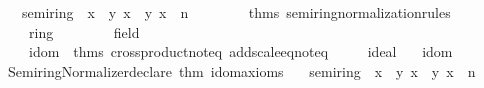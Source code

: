 \begin{isabellebody}
\ \ \ \ {\isacharbraceleft}{\kern0pt}semiring\ {\isacharequal}{\kern0pt}\ {\isacharparenleft}{\kern0pt}{\isacharbrackleft}{\kern0pt}\isactrlterm {\isasymopen}x\ {\isacharplus}{\kern0pt}\ y{\isasymclose}{\isacharcomma}{\kern0pt}\ \isactrlterm {\isasymopen}x\ {\isacharasterisk}{\kern0pt}\ y{\isasymclose}{\isacharcomma}{\kern0pt}\ \isactrlterm {\isasymopen}x\ {\isacharcircum}{\kern0pt}\ n{\isasymclose}{\isacharcomma}{\kern0pt}\ \ \isanewline
\ \ \ \ \ \ {\isacharat}{\kern0pt}{\isacharbraceleft}{\kern0pt}thms\ semiring{\isacharunderscore}{\kern0pt}normalization{\isacharunderscore}{\kern0pt}rules{\isacharbraceright}{\kern0pt}{\isacharparenright}{\kern0pt}{\isacharcomma}{\kern0pt}\isanewline
\ \ \ \ \ ring\ {\isacharequal}{\kern0pt}\ {\isacharparenleft}{\kern0pt}{\isacharbrackleft}{\kern0pt}{\isacharbrackright}{\kern0pt}{\isacharcomma}{\kern0pt}\ {\isacharbrackleft}{\kern0pt}{\isacharbrackright}{\kern0pt}{\isacharparenright}{\kern0pt}{\isacharcomma}{\kern0pt}\isanewline
\ \ \ \ \ field\ {\isacharequal}{\kern0pt}\ {\isacharparenleft}{\kern0pt}{\isacharbrackleft}{\kern0pt}{\isacharbrackright}{\kern0pt}{\isacharcomma}{\kern0pt}\ {\isacharbrackleft}{\kern0pt}{\isacharbrackright}{\kern0pt}{\isacharparenright}{\kern0pt}{\isacharcomma}{\kern0pt}\isanewline
\ \ \ \ \ idom\ {\isacharequal}{\kern0pt}\ {\isacharat}{\kern0pt}{\isacharbraceleft}{\kern0pt}thms\ crossproduct{\isacharunderscore}{\kern0pt}noteq\ add{\isacharunderscore}{\kern0pt}scale{\isacharunderscore}{\kern0pt}eq{\isacharunderscore}{\kern0pt}noteq{\isacharbraceright}{\kern0pt}{\isacharcomma}{\kern0pt}\isanewline
\ \ \ \ \ ideal\ {\isacharequal}{\kern0pt}\ {\isacharbrackleft}{\kern0pt}{\isacharbrackright}{\kern0pt}{\isacharbraceright}{\kern0pt}\isanewline
{\isacartoucheclose}%
\endisatagML
{\isafoldML}%
%
\isadelimML
\isanewline
%
\endisadelimML
\isanewline
{}\isamarkupfalse%
\isanewline
\isanewline
{}\isamarkupfalse%
\ idom\isanewline
{}\isanewline
%
\isadelimML
\isanewline
%
\endisadelimML
%
\isatagML
{}\isamarkupfalse%
\ {\isacartoucheopen}\isanewline
\ \ Semiring{\isacharunderscore}{\kern0pt}Normalizer{\isachardot}{\kern0pt}declare\ {\isacharat}{\kern0pt}{\isacharbraceleft}{\kern0pt}thm\ idom{\isacharunderscore}{\kern0pt}axioms{\isacharbraceright}{\kern0pt}\isanewline
\ \ \ {\isacharbraceleft}{\kern0pt}semiring\ {\isacharequal}{\kern0pt}\ {\isacharparenleft}{\kern0pt}{\isacharbrackleft}{\kern0pt}\isactrlterm {\isasymopen}x\ {\isacharplus}{\kern0pt}\ y{\isasymclose}{\isacharcomma}{\kern0pt}\ \isactrlterm {\isasymopen}x\ {\isacharasterisk}{\kern0pt}\ y{\isasymclose}{\isacharcomma}{\kern0pt}\ \isactrlterm {\isasymopen}x\ {\isacharcircum}{\kern0pt}\ n{\isasymclose}{\isacharcomma}{\kern0pt}\ \ \isanewline

\end{isabellebody}
